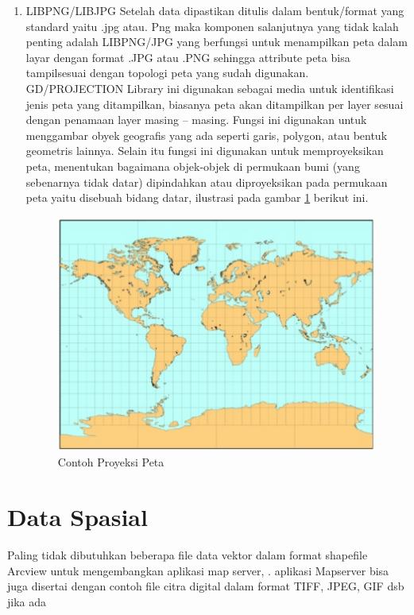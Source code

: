 \begin{enumerate}
\item LIBPNG/LIBJPG
\subitem Setelah data dipastikan ditulis dalam bentuk/format yang standard yaitu .jpg atau. Png maka komponen salanjutnya yang tidak kalah penting adalah LIBPNG/JPG yang berfungsi untuk menampilkan peta dalam layar dengan format .JPG atau .PNG sehingga attribute peta bisa tampilsesuai dengan topologi peta yang sudah digunakan.
GD/PROJECTION Library ini digunakan sebagai media untuk identifikasi jenis peta yang ditampilkan, biasanya peta akan ditampilkan per layer sesuai dengan penamaan layer masing –  masing. 
Fungsi ini digunakan untuk menggambar obyek geografis yang ada seperti garis, polygon, atau bentuk geometris lainnya. Selain itu fungsi ini digunakan untuk memproyeksikan peta, menentukan bagaimana objek-objek di permukaan bumi (yang sebenarnya tidak datar) dipindahkan atau diproyeksikan pada permukaan peta yaitu disebuah bidang datar, ilustrasi pada gambar \ref{Contoh Proyeksi Peta} berikut ini.
\begin{figure}[ht]
\centering
\includegraphics[width=1\textwidth]{pictures/contoh_proyeksi_peta}
\caption{Contoh Proyeksi Peta}
\label{Contoh Proyeksi Peta}
\end{figure}
\end{enumerate}

\section{ Data Spasial}
Paling tidak dibutuhkan beberapa file data vektor dalam format shapefile Arcview untuk mengembangkan aplikasi map server, . aplikasi Mapserver bisa juga disertai dengan contoh file citra digital dalam format TIFF, JPEG, GIF dsb jika ada

